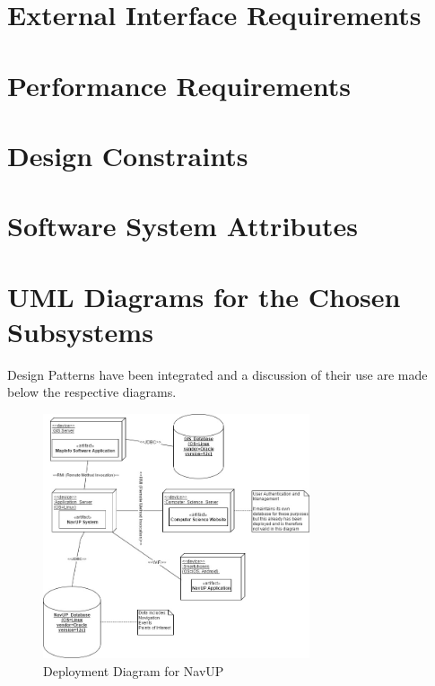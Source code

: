 \documentclass[runningheads,a4paper]{article}
\begin{document}



\begingroup



\tableofcontents


\endgroup

\newpage




\section{External Interface Requirements}


\section{Performance Requirements}


\section{Design Constraints}


\section{Software System Attributes}


\section{UML Diagrams for the Chosen Subsystems}

Design Patterns have been integrated and a discussion of their use are made below the respective diagrams.


\begin{figure}[H]
   	\centering
   	\includegraphics[width=0.7\textwidth]{DeploymentDiagram.jpg}
   	\caption{Deployment Diagram for NavUP}
\end{figure}
\end{document}
